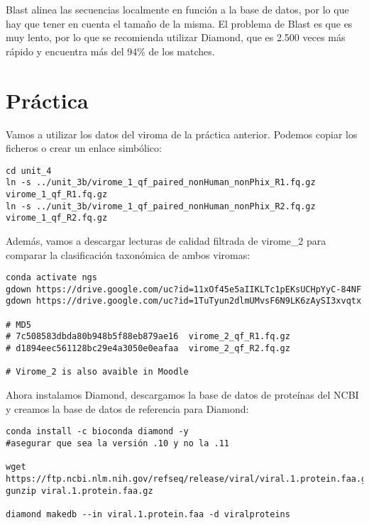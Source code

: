 Blast alinea las secuencias localmente en función a la base de datos, por lo que hay que tener en cuenta el tamaño de la misma. El problema de Blast es que es muy lento, por lo que se recomienda utilizar Diamond, que es 2.500 veces más rápido y encuentra más del 94\% de los matches. 

\section{Práctica}
Vamos a utilizar los datos del viroma de la práctica anterior. Podemos copiar los ficheros o crear un enlace simbólico:
\begin{lstlisting}
cd unit_4
ln -s ../unit_3b/virome_1_qf_paired_nonHuman_nonPhix_R1.fq.gz virome_1_qf_R1.fq.gz
ln -s ../unit_3b/virome_1_qf_paired_nonHuman_nonPhix_R2.fq.gz virome_1_qf_R2.fq.gz
\end{lstlisting}

Además, vamos a descargar lecturas de calidad filtrada de virome\_2 para comparar la clasificación taxonómica de ambos viromas:
\begin{lstlisting}
conda activate ngs
gdown https://drive.google.com/uc?id=11xOf45e5aIIKLTc1pEKsUCHpYyC-84NF
gdown https://drive.google.com/uc?id=1TuTyun2dlmUMvsF6N9LK6zAySI3xvqtx

# MD5
# 7c508583dbda80b948b5f88eb879ae16  virome_2_qf_R1.fq.gz
# d1894eec561128bc29e4a3050e0eafaa  virome_2_qf_R2.fq.gz

# Virome_2 is also avaible in Moodle
\end{lstlisting}

Ahora instalamos Diamond, descargamos la base de datos de proteínas del NCBI y creamos la base de datos de referencia para Diamond:
\begin{lstlisting}
conda install -c bioconda diamond -y 
#asegurar que sea la versión .10 y no la .11

wget https://ftp.ncbi.nlm.nih.gov/refseq/release/viral/viral.1.protein.faa.gz
gunzip viral.1.protein.faa.gz

diamond makedb --in viral.1.protein.faa -d viralproteins
\end{lstlisting}

